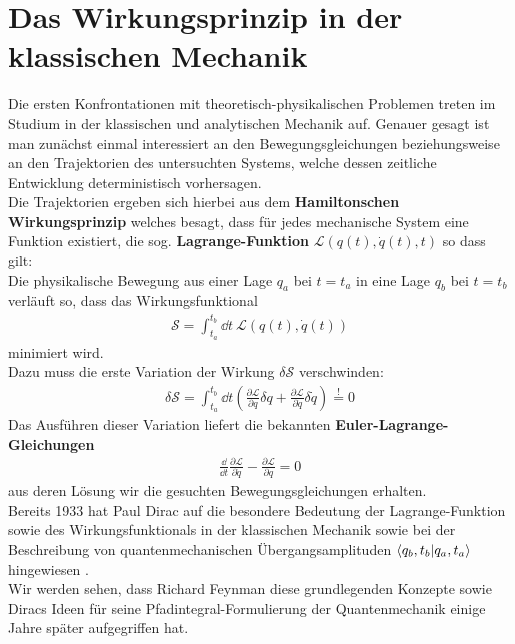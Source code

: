 \section{Das Wirkungsprinzip in der klassischen Mechanik}
Die ersten Konfrontationen mit theoretisch-physikalischen Problemen treten im Studium in der klassischen und analytischen Mechanik auf. Genauer gesagt ist man zunächst einmal interessiert an den Bewegungsgleichungen beziehungsweise an den Trajektorien des untersuchten Systems, welche dessen zeitliche Entwicklung deterministisch vorhersagen. \\
Die Trajektorien ergeben sich hierbei aus dem \textbf{Hamiltonschen Wirkungsprinzip} welches besagt, dass für jedes mechanische System eine Funktion existiert, die sog. \textbf{Lagrange-Funktion} $\mathcal{L}(q(t),\dot{q}(t),t)$ so dass gilt: \\

Die physikalische Bewegung aus einer Lage $q_a$ bei $t = t_a$ in eine Lage $q_b$ bei $t = t_b$ verläuft so, dass das Wirkungsfunktional
\begin{align}
	\mathcal{S} = \int_{t_a}^{t_b} \dd t \ \mathcal{L}(q(t),\dot{q}(t)) 
\end{align}
minimiert wird. \\
Dazu muss die erste Variation der Wirkung $\delta\mathcal{S}$ verschwinden:
\begin{align}
		\delta \mathcal{S} = \int_{t_a}^{t_b} \dd t \left(\frac{\partial \mathcal{L}}{\partial q} \delta q + \frac{\partial \mathcal{L}}{\partial \dot{q}} \delta \dot{q}\right) \overset{!}{ = } 0
	\end{align}
Das Ausführen dieser Variation liefert die bekannten \textbf{Euler-Lagrange-Gleichungen} 
\begin{align}
		\frac{\dd}{\dd t}\frac{\partial \mathcal{L}}{\partial \dot{q}} - \frac{\partial \mathcal{L}}{\partial q} = 0
\end{align}
aus deren Lösung wir die gesuchten Bewegungsgleichungen erhalten. \\
Bereits 1933 hat Paul Dirac auf die besondere Bedeutung der Lagrange-Funktion sowie des Wirkungsfunktionals in der klassischen Mechanik sowie bei der Beschreibung von quantenmechanischen Übergangsamplituden $\braket{q_b,t_b}{q_a,t_a}$ hingewiesen \cite{Dirac1934}. \\
Wir werden sehen, dass Richard Feynman diese grundlegenden Konzepte sowie Diracs Ideen für seine Pfadintegral-Formulierung der Quantenmechanik einige Jahre später aufgegriffen hat.

